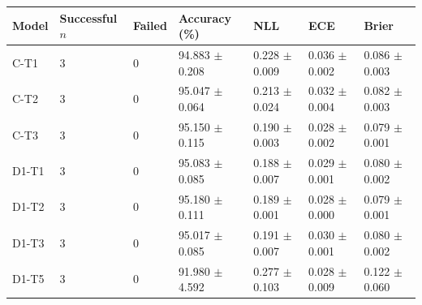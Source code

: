 \begin{tabular}{lllllll}
\toprule
Model & Successful $n$ & Failed & Accuracy (\%) & NLL & ECE & Brier \\
\midrule
C-T1 & 3 & 0 & 94.883 $\pm$ 0.208 & 0.228 $\pm$ 0.009 & 0.036 $\pm$ 0.002 & 0.086 $\pm$ 0.003 \\
C-T2 & 3 & 0 & 95.047 $\pm$ 0.064 & 0.213 $\pm$ 0.024 & 0.032 $\pm$ 0.004 & 0.082 $\pm$ 0.003 \\
C-T3 & 3 & 0 & 95.150 $\pm$ 0.115 & 0.190 $\pm$ 0.003 & 0.028 $\pm$ 0.002 & 0.079 $\pm$ 0.001 \\
D1-T1 & 3 & 0 & 95.083 $\pm$ 0.085 & 0.188 $\pm$ 0.007 & 0.029 $\pm$ 0.001 & 0.080 $\pm$ 0.002 \\
D1-T2 & 3 & 0 & 95.180 $\pm$ 0.111 & 0.189 $\pm$ 0.001 & 0.028 $\pm$ 0.000 & 0.079 $\pm$ 0.001 \\
D1-T3 & 3 & 0 & 95.017 $\pm$ 0.085 & 0.191 $\pm$ 0.007 & 0.030 $\pm$ 0.001 & 0.080 $\pm$ 0.002 \\
D1-T5 & 3 & 0 & 91.980 $\pm$ 4.592 & 0.277 $\pm$ 0.103 & 0.028 $\pm$ 0.009 & 0.122 $\pm$ 0.060 \\
\bottomrule
\end{tabular}
